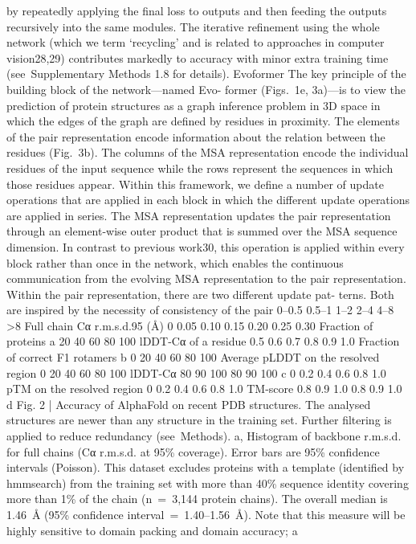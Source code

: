 by repeatedly applying the final loss to outputs and then feeding the
outputs recursively into the same modules. The iterative refinement
using the whole network (which we term ‘recycling’ and is related to
approaches in computer vision28,29) contributes markedly to accuracy
with minor extra training time (see Supplementary Methods 1.8 for
details).
Evoformer
The key principle of the building block of the network—named Evo-
former (Figs. 1e, 3a)—is to view the prediction of protein structures
as a graph inference problem in 3D space in which the edges of the
graph are defined by residues in proximity. The elements of the pair
representation encode information about the relation between the
residues (Fig. 3b). The columns of the MSA representation encode the
individual residues of the input sequence while the rows represent
the sequences in which those residues appear. Within this framework,
we define a number of update operations that are applied in each block
in which the different update operations are applied in series.
The MSA representation updates the pair representation through an
element-wise outer product that is summed over the MSA sequence
dimension. In contrast to previous work30, this operation is applied
within every block rather than once in the network, which enables the
continuous communication from the evolving MSA representation to
the pair representation.
Within the pair representation, there are two different update pat-
terns. Both are inspired by the necessity of consistency of the pair
0–0.5
0.5–1
1–2
2–4
4–8
>8
Full chain Cα r.m.s.d.95 (Å)
0
0.05
0.10
0.15
0.20
0.25
0.30
Fraction of proteins
a
20
40
60
80
100
lDDT-Cα of a residue
0.5
0.6
0.7
0.8
0.9
1.0
Fraction of correct F1 rotamers
b
0
20
40
60
80
100
Average pLDDT on the resolved region
0
20
40
60
80
100
lDDT-Cα
80
90
100
80
90
100
c
0
0.2
0.4
0.6
0.8
1.0
pTM on the resolved region
0
0.2
0.4
0.6
0.8
1.0
TM-score
0.8
0.9
1.0
0.8
0.9
1.0
d
Fig. 2 | Accuracy of AlphaFold on recent PDB structures. The analysed
structures are newer than any structure in the training set. Further filtering is
applied to reduce redundancy (see Methods). a, Histogram of backbone
r.m.s.d. for full chains (Cα r.m.s.d. at 95\% coverage). Error bars are 95\%
confidence intervals (Poisson). This dataset excludes proteins with a template
(identified by hmmsearch) from the training set with more than 40\% sequence
identity covering more than 1\% of the chain (n = 3,144 protein chains). The
overall median is 1.46 Å (95\% confidence interval = 1.40–1.56 Å). Note that this
measure will be highly sensitive to domain packing and domain accuracy; a
